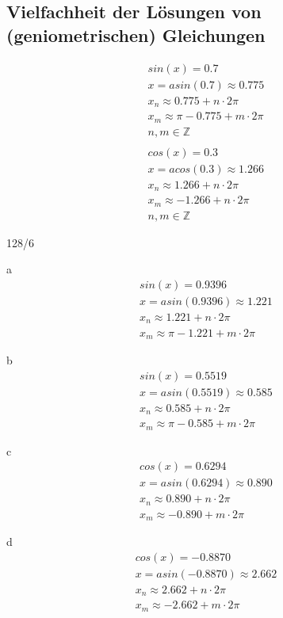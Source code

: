\subsection{Vielfachheit der Lösungen von (geniometrischen) Gleichungen} 
\begin{gather*}
  sin(x) = 0.7 \\
  x = asin(0.7) \approx 0.775 \\
  x_n \approx 0.775 + n \cdot 2\pi \\
  x_m \approx \pi - 0.775 + m \cdot 2\pi \\
  n, m \in \mathbb{Z} \\\\
  cos(x) = 0.3 \\
  x = acos(0.3) \approx 1.266 \\
  x_n \approx 1.266 + n \cdot 2\pi \\
  x_m \approx -1.266 + n \cdot 2\pi \\
  n, m \in \mathbb{Z}
\end{gather*}
\begin{exercise}{128/6}
  \item [a]
  \begin{gather*}
    sin(x) = 0.9396 \\
    x = asin(0.9396) \approx 1.221 \\
    x_n \approx 1.221 + n \cdot 2\pi \\
    x_m \approx \pi - 1.221 + m \cdot 2\pi
  \end{gather*}
  \item [b]
  \begin{gather*}
    sin(x) = 0.5519 \\
    x = asin(0.5519) \approx 0.585 \\
    x_n \approx 0.585 + n \cdot 2\pi \\
    x_m \approx \pi - 0.585 + m \cdot 2\pi
  \end{gather*}
  \item [c]
  \begin{gather*}
    cos(x) = 0.6294 \\
    x = asin(0.6294) \approx 0.890 \\
    x_n \approx 0.890 + n \cdot 2\pi \\
    x_m \approx -0.890 + m \cdot 2\pi
  \end{gather*}
  \item [d]
  \begin{gather*}
    cos(x) = -0.8870 \\
    x = asin(-0.8870) \approx 2.662 \\
    x_n \approx 2.662 + n \cdot 2\pi \\
    x_m \approx -2.662 + m \cdot 2\pi
  \end{gather*}
\end{exercise}
